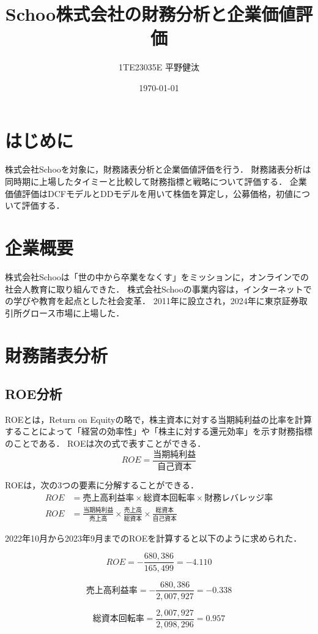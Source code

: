 \documentclass[a4paper]{ltjsarticle}
\begin{document}
\title{Schoo株式会社の財務分析と企業価値評価}
\author{1TE23035E 平野健汰}
\date{\today}

\maketitle

\section{はじめに}
株式会社Schooを対象に，財務諸表分析と企業価値評価を行う．
財務諸表分析は同時期に上場したタイミーと比較して財務指標と戦略について評価する．
企業価値評価はDCFモデルとDDモデルを用いて株価を算定し，公募価格，初値について評価する．

\section{企業概要}
株式会社Schooは「世の中から卒業をなくす」をミッションに，オンラインでの社会人教育に取り組んできた．
株式会社Schooの事業内容は，インターネットでの学びや教育を起点とした社会変革．
2011年に設立され，2024年に東京証券取引所グロース市場に上場した．

\section{財務諸表分析}
\subsection{ROE分析}
ROEとは，Return on Equityの略で，株主資本に対する当期純利益の比率を計算することによって「経営の効率性」や「株主に対する還元効率」を示す財務指標のことである．
ROEは次の式で表すことができる．
\[
ROE = \frac{当期純利益}{自己資本}
\]

ROEは，次の3つの要素に分解することができる．
\begin{align*}
ROE &= 売上高利益率 \times 総資本回転率 \times 財務レバレッジ率 \\
ROE &= \frac{当期純利益}{売上高} \times \frac{売上高}{総資本} \times \frac{総資本}{自己資本}
\end{align*}

2022年10月から2023年9月までのROEを計算すると以下のように求められた．

\[
ROE = -\frac{680,386}{165,499} = -4.110
\]

\[
売上高利益率 = -\frac{680,386}{2,007,927} = -0.338
\]

\[
総資本回転率 = \frac{2,007,927}{2,098,296} = 0.957
\]
\end{document}
